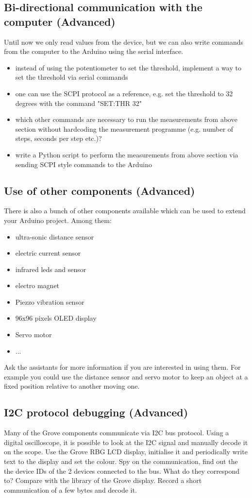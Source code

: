 \subsection{Bi-directional communication with the computer (Advanced)}\label{sec:bi}
Until now we only read values from the device, but we can also write commands from the computer to the Arduino using the serial interface.
\begin{itemize}
	\item instead of using the potentiometer to set the threshold, implement a way to set the threshold via serial commands
	\item one can use the SCPI protocol as a reference, e.g. set the threshold to 32 degrees with the command "SET:THR 32"
	\item which other commands are necessary to run the measurements from above section without hardcoding the measurement programme (e.g. number of steps, seconds per step etc.)?
	\item write a Python script to perform the measurements from above section via sending SCPI style commands to the Arduino
\end{itemize}


\subsection{Use of other components (Advanced)}
There is also a bunch of other components available which can be used to extend your Arduino project. Among them:
\begin{itemize}
	\item ultra-sonic distance sensor
	\item electric current sensor
	\item infrared leds and sensor
	\item electro magnet
	\item Piezzo vibration sensor
	\item 96x96 pixels OLED display
	\item Servo motor
	\item ...
\end{itemize}

Ask the assistants for more information if you are interested in using them. For example you could use the distance sensor and servo motor to keep an object at a fixed position relative to another moving one.


\subsection{I2C protocol debugging (Advanced)}
Many of the Grove components communicate via I2C bus protocol. Using a digital oscilloscope, it is possible to look at the I2C signal and manually decode it on the scope. Use the Grove RBG LCD display, initialise it and periodically write text to the display and set the colour. Spy on the communication, find out the the device IDs of the 2 devices connected to the bus. What do they correspond to? Compare with the library of the Grove display. Record a short communication of a few bytes and decode it.

